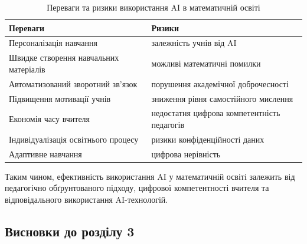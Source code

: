 \begin{table}[H]
\centering

\caption{Переваги та ризики використання AI в математичній освіті}
\label{tab:advantages_risks}

\renewcommand{\arraystretch}{1.4}

\begin{tabular}{|p{6cm}|p{6cm}|}
\hline

\textbf{Переваги} &
\textbf{Ризики} \\

\hline

Персоналізація навчання &
залежність учнів від AI \\

\hline

Швидке створення навчальних матеріалів &
можливі математичні помилки \\

\hline

Автоматизований зворотний зв’язок &
порушення академічної доброчесності \\

\hline

Підвищення мотивації учнів &
зниження рівня самостійного мислення \\

\hline

Економія часу вчителя &
недостатня цифрова компетентність педагогів \\

\hline

Індивідуалізація освітнього процесу &
ризики конфіденційності даних \\

\hline

Адаптивне навчання &
цифрова нерівність \\

\hline

\end{tabular}

\end{table}

Таким чином, ефективність використання AI у математичній освіті залежить від педагогічно обґрунтованого підходу, цифрової компетентності вчителя та відповідального використання AI-технологій.

\subsection*{Висновки до розділу 3}

